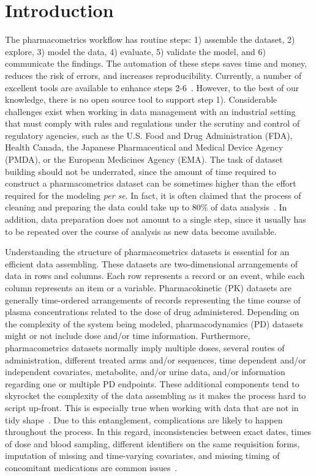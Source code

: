 \newpage


\section{Introduction}
The pharmacometrics workflow has routine steps: 1) assemble the dataset, 2) explore, 3) model the data, 4) evaluate, 5) validate the model, and 6) communicate the findings. The automation of these steps saves time and money, reduces the risk of errors, and increases reproducibility. Currently, a number of excellent tools are available to enhance steps 2-6~\citep{Jonsson1999, Lindbom2005, Keizer2011, Keizer2015, Mouksassi2016, Wang2016, Keizer2018, Xie2018, Mouksassi2019, Baron2019,RStudio}. However, to the best of our knowledge, there is no open source tool to support step 1). 
Considerable challenges exist when working in data management with an industrial setting that must comply with rules and regulations under the scrutiny and control of regulatory agencies, such as the U.S. Food and Drug Administration (FDA), Health Canada, the Japanese Pharmaceutical and Medical Device Agency (PMDA), or the European Medicines Agency (EMA). The task of dataset building should not be underrated, since the amount of time required to construct a pharmacometrics dataset can be sometimes higher than the effort required for the modeling \textit{per se}. In fact, it is often claimed that the process of cleaning and preparing the data could take up to 80\% of data analysis~\citep{Dasu2003}. In addition, data preparation does not amount to a single step, since it usually has to be repeated over the course of analysis as new data become available. 

Understanding the structure of pharmacometrics datasets is essential for an efficient data assembling. These datasets are two-dimensional arrangements of data in rows and columns. Each row represents a record or an event, while each column represents an item or a variable. Pharmacokinetic (PK) datasets are generally time-ordered arrangements of records representing the time course of plasma concentrations related to the dose of drug administered. Depending on the complexity of the system being modeled, pharmacodynamics (PD) datasets might or not include dose and/or time information. Furthermore, pharmacometrics datasets normally imply multiple doses, several routes of administration, different treated arms and/or sequences, time dependent and/or independent covariates, metabolite, and/or urine data, and/or information regarding one or multiple PD endpoints. These additional components tend to skyrocket the complexity of the data assembling as it makes the process hard to script up-front. This is especially true when working with data that are not in tidy shape~\citep{Wickham2014}. Due to this entanglement, complications are likely to happen throughout the process. In this regard, inconsistencies between exact dates, times of dose and blood sampling, different identifiers on the same requisition forms, imputation of missing and time-varying covariates, and missing timing of concomitant medications are common issues~\citep{Grasela2007}.


